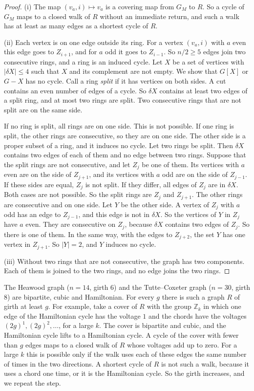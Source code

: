 \documentclass[11pt]{article}
\begin{document}
\begin{proof}
(i) The map $(v_a,i)\mapsto v_a$ is a covering map from $G_M$ to $R$. So a cycle of $G_M$ maps to
a closed walk of $R$ without an immediate return, and such a walk has at least as many edges as a
shortest cycle of $R$.

(ii) Each vertex is on one edge outside its ring. For a vertex $(v_a,i)$ with $a$ even this edge
goes to $Z_{i+1}$, and for $a$ odd it goes to $Z_{i-1}$. So $n/2\ge5$ edges join two consecutive
rings, and a ring is an induced cycle. Let $X$ be a set of vertices with $|\delta X|\le4$ such
that $X$ and its complement are not empty. We show that $G[X]$ or $G-X$ has no cycle. Call a ring
\emph{split} if it has vertices on both sides. A cut contains an even number of edges of a cycle.
So $\delta X$ contains at least two edges of a split ring, and at most two rings are split. Two
consecutive rings that are not split are on the same side.

If no ring is split, all rings are on one side. This is not possible. If one ring is split, the
other rings are consecutive, so they are on one side. The other side is a proper subset of a
ring, and it induces no cycle. Let two rings be split. Then $\delta X$ contains two edges of
each of them and no edge between two rings. Suppose that the split rings are not consecutive,
and let $Z_j$ be one of them. Its vertices with $a$ even are on the side of $Z_{j+1}$, and its
vertices with $a$ odd are on the side of $Z_{j-1}$. If these sides are equal, $Z_j$ is not split.
If they differ, all edges of $Z_j$ are in $\delta X$. Both cases are not possible. So the split
rings are $Z_j$ and $Z_{j+1}$. The other rings are consecutive and on one side. Let $Y$ be the
other side. A vertex of $Z_j$ with $a$ odd has an edge to $Z_{j-1}$, and this edge is not in $\delta X$.
So the vertices of $Y$ in $Z_j$ have $a$ even. They are consecutive on $Z_j$, because $\delta X$
contains two edges of $Z_j$. So there is one of them. In the same way, with the edges to
$Z_{j+2}$, the set $Y$ has one vertex in $Z_{j+1}$. So $|Y|=2$, and $Y$ induces no cycle.

(iii) Without two rings that are not consecutive, the graph has two components. Each of them is
joined to the two rings, and no edge joins the two rings.
\end{proof}

The Heawood graph ($n=14$, girth $6$) and the Tutte--Coxeter graph ($n=30$, girth $8$) are
bipartite, cubic and Hamiltonian. For every $g$ there is such a graph $R$ of girth at least $g$.
For example, take a cover of $R$ with the group $\mathbb Z_k$ in which one edge of the Hamiltonian
cycle has the voltage $1$ and the chords have the voltages $(2g)^{1},(2g)^{2},\dots$, for a large
$k$. The cover is bipartite and cubic, and the Hamiltonian cycle lifts to a Hamiltonian cycle. A
cycle of the cover with fewer than $g$ edges maps to a closed walk of $R$ whose voltages add up
to zero. For a large $k$ this is possible only if the walk uses each of these edges the same
number of times in the two directions. A shortest cycle of $R$ is not such a walk,
because it uses a chord one time, or it is the Hamiltonian cycle. So the girth increases, and we
repeat the step.
\end{document}

